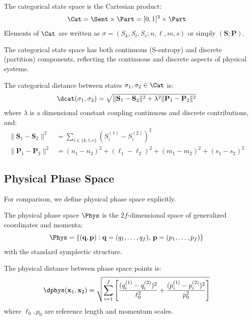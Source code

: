 \begin{definition}
\label{def:categorical_space}
The categorical state space is the Cartesian product:
\begin{equation}
\Cat = \Sent \times \Part = [0,1]^3 \times \Part
\end{equation}
Elements of $\Cat$ are written as $\sigma = (S_k, S_t, S_e; n, \ell, m, s)$ or simply $(\mathbf{S}; \mathbf{P})$.
\end{definition}

The categorical state space has both continuous (S-entropy) and discrete (partition) components, reflecting the continuous and discrete aspects of physical systems.

\begin{definition}
\label{def:categorical_distance}
The categorical distance between states $\sigma_1, \sigma_2 \in \Cat$ is:
\begin{equation}
\dcat(\sigma_1, \sigma_2) = \sqrt{\|\mathbf{S}_1 - \mathbf{S}_2\|^2 + \lambda^2 \|\mathbf{P}_1 - \mathbf{P}_2\|^2}
\label{eq:cat_distance}
\end{equation}
where $\lambda$ is a dimensional constant coupling continuous and discrete contributions, and:
\begin{align}
\|\mathbf{S}_1 - \mathbf{S}_2\|^2 &= \sum_{i \in \{k,t,e\}} (S_i^{(1)} - S_i^{(2)})^2 \\
\|\mathbf{P}_1 - \mathbf{P}_2\|^2 &= (n_1 - n_2)^2 + (\ell_1 - \ell_2)^2 + (m_1 - m_2)^2 + (s_1 - s_2)^2
\end{align}
\end{definition}

\subsection{Physical Phase Space}

For comparison, we define physical phase space explicitly.

\begin{definition}
The physical phase space $\Phys$ is the $2f$-dimensional space of generalized coordinates and momenta:
\begin{equation}
\Phys = \{(\mathbf{q}, \mathbf{p}) : \mathbf{q} = (q_1, \ldots, q_f), \, \mathbf{p} = (p_1, \ldots, p_f)\}
\end{equation}
with the standard symplectic structure.
\end{definition}

\begin{definition}
The physical distance between phase space points is:
\begin{equation}
\dphys(\mathbf{x}_1, \mathbf{x}_2) = \sqrt{\sum_{i=1}^{f} \left[\frac{(q_i^{(1)} - q_i^{(2)})^2}{\ell_0^2} + \frac{(p_i^{(1)} - p_i^{(2)})^2}{p_0^2}\right]}
\label{eq:phys_distance}
\end{equation}
where $\ell_0, p_0$ are reference length and momentum scales.
\end{definition}

